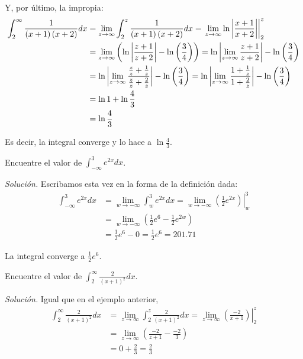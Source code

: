 Y, por último, la impropia:
\begin{gather*}
  \begin{aligned}
    \int_{2}^{\infty }\frac{1}{\left( x+1\right) \left( x+2\right) }%
    dx& =\lim_{z\rightarrow \infty }\int_{2}^{z}\frac{1}{\left( x+1\right) \left(x+2\right) }dx=\left.\lim_{z\rightarrow \infty }\ln \left\vert \frac{x+1}{x+2}\right\vert \right\vert_{2}^{z}\\
    &=\lim_{z\rightarrow \infty }\left( \ln \left\vert \frac{z+1}{z+2}%
    \right\vert -\ln \left( \frac{3}{4}\right) \right)=\ln \left\vert\lim_{z\rightarrow \infty }\frac{z+1}{z+2}\right\vert -\ln \left( \frac{3}{4}\right)\\
    &=\ln \left\vert \lim_{z\rightarrow \infty }\frac{\frac{z}{z}+\frac{1}{z}}{%
    \frac{z}{z}+\frac{2}{z}}\right\vert -\ln \left( \frac{3}{4}\right)=\ln\left\vert \lim_{z\rightarrow \infty }\frac{1+\frac{1}{z}}{1+\frac{2}{z}}\right\vert -\ln \left( \frac{3}{4}\right)\\
    &=\ln 1+\ln \frac{4}{3}\\
    &=\ln \frac{4}{3}
  \end{aligned}
\end{gather*}

Es decir, la integral converge y lo hace a $\ln \frac{4}{3}$.

\begin{ejemplo}
  Encuentre el valor de $\int_{-\infty }^{3}e^{2x}dx$.
\end{ejemplo}

\emph{Solución.} Escribamos esta vez en la forma de la definición dada:
\begin{align*}
  \int_{-\infty }^{3}e^{2x}dx&=\lim_{w\rightarrow -\infty
  }\int_{w}^{3}e^{2x}dx=\left.\lim_{w\rightarrow -\infty }\left( \frac{1}{2}%
  e^{2x}\right)\right\vert_{w}^{3} \\
  &=\lim_{w\rightarrow -\infty }\left( \frac{1}{2}e^{6}-\frac{1}{2}%
  e^{2w}\right)\\
  &=\frac{1}{2}e^{6}-0=\frac{1}{2}e^{6}=201.71
\end{align*}

La integral converge a $\frac{1}{2}e^{6}$.

\begin{ejemplo}
  Encuentre el valor de $\int_{2}^{\infty }\frac{2}{\left( x+1\right) ^{2}}dx$.
\end{ejemplo}
\emph{Solución.} Igual que en el ejemplo anterior,
\begin{align*}
  \int_{2}^{\infty }\frac{2}{\left( x+1\right) ^{2}}dx&=\lim_{z\rightarrow
  \infty }\int_{2}^{z}\frac{2}{\left( x+1\right) ^{2}}dx=\left.\lim_{z\rightarrow \infty }\left( \frac{-2}{x+1}\right)\right\vert_{2}^{z} \\
  &=\lim_{z\rightarrow \infty }\left( \frac{-2}{z+1}-\frac{-2}{3}\right) \\
  &=0+\frac{2}{3}=\frac{2}{3}
\end{align*}

